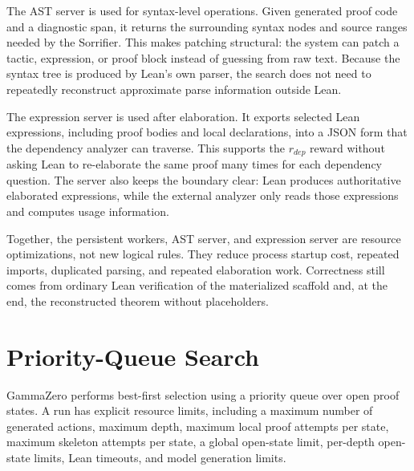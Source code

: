 The AST server is used for syntax-level operations. Given generated proof code and a diagnostic span, it
returns the surrounding syntax nodes and source ranges needed by the Sorrifier. This makes patching
structural: the system can patch a tactic, expression, or proof block instead of guessing from raw text.
Because the syntax tree is produced by Lean's own parser, the search does not need to repeatedly
reconstruct approximate parse information outside Lean.

The expression server is used after elaboration. It exports selected Lean expressions, including proof
bodies and local declarations, into a JSON form that the dependency analyzer can traverse. This supports
the \(r_{dep}\) reward without asking Lean to re-elaborate the same proof many times for each dependency
question. The server also keeps the boundary clear: Lean produces authoritative elaborated expressions,
while the external analyzer only reads those expressions and computes usage information.

Together, the persistent workers, AST server, and expression server are resource optimizations, not new
logical rules. They reduce process startup cost, repeated imports, duplicated parsing, and repeated
elaboration work. Correctness still comes from ordinary Lean verification of the materialized scaffold
and, at the end, the reconstructed theorem without placeholders.

\section{Priority-Queue Search}

GammaZero performs best-first selection using a priority queue over open proof states. A run has explicit resource limits, including a maximum number of generated actions, maximum depth, maximum local proof attempts per state, maximum skeleton attempts per state, a global open-state limit, per-depth open-state limits, Lean timeouts, and model generation limits.

